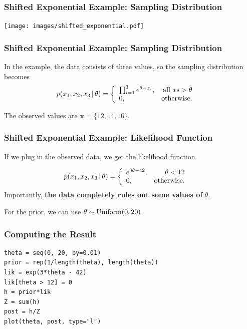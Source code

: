 \documentclass{beamer}
\newcommand{\given}{\,|\,}
\begin{document}
\begin{frame}[fragile]
\frametitle{Shifted Exponential Example: Sampling Distribution}
\centering
\texttt{[image: images/shifted\_exponential.pdf]}

\end{frame}



\begin{frame}[fragile]
\frametitle{Shifted Exponential Example: Sampling Distribution}
In the example, the data consists of three values, so the sampling distribution
becomes
\begin{align}
p(x_1, x_2, x_3 \given \theta)
    &= \left\{
    \begin{array}{lr}
     \prod_{i=1}^3  e^{\theta - x_i}, & \textnormal{all }x\textnormal{s} > \theta \\
    0,              & \textnormal{otherwise.}
    \end{array}
    \right.
\end{align}

\pause

The observed values are $\boldsymbol{x} = \{12, 14, 16\}$.


\end{frame}


\begin{frame}[fragile]
\frametitle{Shifted Exponential Example: Likelihood Function}
If we plug in the observed data, we get the likelihood function.

\begin{align}
p(x_1, x_2, x_3 \given \theta)
    &= \left\{
    \begin{array}{lr}
    e^{3\theta - 42}, & \theta < 12\\
    0,              & \textnormal{otherwise.}
    \end{array}
    \right.
\end{align}
Importantly, {\bf the data completely rules out some values of} $\theta$.
\pause

For the prior, we can use $\theta \sim \textnormal{Uniform}(0, 20)$.
\end{frame}



\begin{frame}[fragile]
\frametitle{Computing the Result}
\begin{verbatim}
theta = seq(0, 20, by=0.01)
prior = rep(1/length(theta), length(theta))
lik = exp(3*theta - 42)
lik[theta > 12] = 0
h = prior*lik
Z = sum(h)
post = h/Z
plot(theta, post, type="l")
\end{verbatim}

\end{frame}
\end{document}
